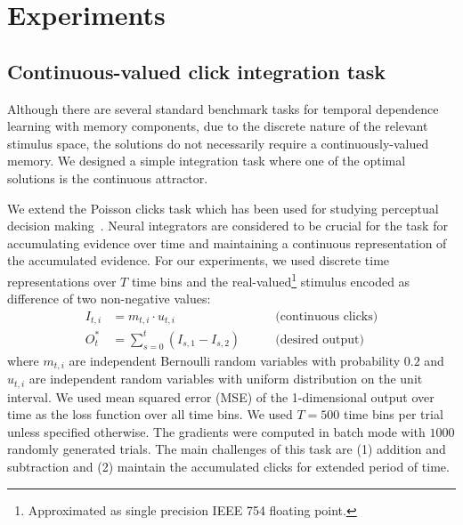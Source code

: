 \documentclass{article}
\newcounter{ct}
\theoremstyle{definition}
\theoremstyle{remark}
\begin{document}

\section{Experiments}
\subsection{Continuous-valued click integration task}\label{sec:task:continuous-clicks}
Although there are several standard benchmark tasks for temporal dependence learning with memory components,
due to the discrete nature of the relevant stimulus space, the solutions do not necessarily require a continuously-valued memory.
We designed a simple integration task where one of the optimal solutions is the continuous attractor.

We extend the Poisson clicks task which has been used for studying perceptual decision making~\cite{bruntonRatsHumansCan2013}.
Neural integrators are considered to be crucial for the task for accumulating evidence over time and maintaining a continuous representation of the accumulated evidence.
For our experiments, we used discrete time representations over $T$ time bins and the real-valued\footnote{Approximated as single precision IEEE 754 floating point.} stimulus encoded as difference of two non-negative values:
\begin{align}
    I_{t,i} &= m_{t,i} \cdot u_{t,i} 
            & \qquad \text{(continuous clicks)}
    \\
    O^\ast_{t} &= \sum_{s=0}^{t} \left(
        I_{s,1} - I_{s,2}
        \right)
            & \qquad \text{(desired output)}
\end{align}
where $m_{t,i}$ are independent Bernoulli random variables with probability $0.2$ and $u_{t,i}$ are independent random variables with uniform distribution on the unit interval.
We used mean squared error (MSE) of the 1-dimensional output over time as the loss function over all time bins.
We used $T=500$ time bins per trial unless specified otherwise.
The gradients were computed in batch mode with $1000$ randomly generated trials.
The main challenges of this task are (1) addition and subtraction and (2) maintain the accumulated clicks for extended period of time.
\end{document}
